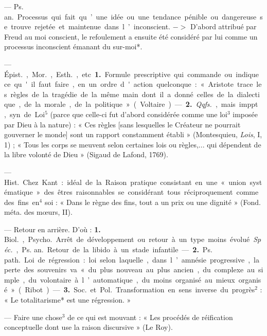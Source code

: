 \begin{itemize}[leftmargin=1cm, label=, itemsep=1pt]
 — \si{Ps. an.} Processus
qui fait qu’une idée ou une tendance
pénible ou dangereuse se trouve
rejetée et maintenue dans l’inconscient. $->$ D'abord attribué par
Freud au moi conscient, le refoulement a ensuite été considéré par lui
comme un processus inconscient
émanant du sur-moi*.

 — \si{Épist.}, \si{Mor.}, \si{Esth.}, etc. {\bf 1.}
Formule prescriptive qui commande
ou indique ce qu'il faut faire, en un
ordre d'action quelconque : « Aristote trace les règles de la tragédie
de la même main dont il a donné
celles de la dialectique, de la morale,
de la politique » (Voltaire). —
 {\bf 2.} {\it Qqfs.}, mais imppt, syn. de Loi$^5$
(parce que celle-ci fut d’abord considérée comme une loi$^3$ imposée par
Dieu à la nature) : « Ces règles [sans
lesquelles le Créateur ne pourrait
gouverner le monde] sont un rapport constamment établi » (Montesquieu, {\it Lois}, I, 1) ; « Tous les corps
se meuvent selon certaines lois ou
règles,... qui dépendent de la
libre volonté de Dieu » (Sigaud de
Lafond, 1769).

 — \si{Hist.} Chez Kant :
idéal de la Raison pratique consistant en une « union systématique »
des êtres raisonnables se considérant tous réciproquement comme
des fins en$^4$ soi : « Dans le règne des
fins, tout a un prix ou une dignité »
(Fond. méta. des mœurs, II).

 — Retour en arrière.
D'où : {\bf 1.} \si{Biol.}, \si{Psycho.} Arrêt de
développement ou retour à un type
moins évolué. {\it Spéc.}, \si{Ps. an.} Retour
de la libido à un stade infantile. —
 {\bf 2.} \si{Ps. path.} Loi de régression : loi
selon laquelle, dans l’amnésie progressive, la perte des souvenirs va
« du plus nouveau au plus ancien,
du complexe au simple, du volontaire à l’automatique, du moins
organisé au mieux organisé » (Ribot).
— {\bf 3.} \si{Soc.} et \si{Pol.} Transformation
en sens inverse du progrès$^2$ :
« Le totalitarisme* est une régression. »

 — Faire une chose$^3$ de ce qui
est mouvant : « Les procédés de
réification conceptuelle dont use
la raison discursive » (Le Roy).


\end{itemize}
